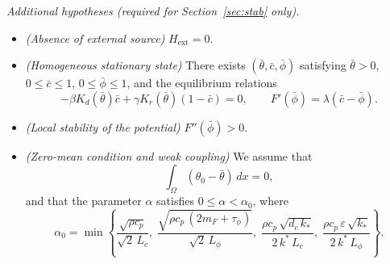 \documentclass[final,1p,times]{elsarticle}
\numberwithin{equation}{section}
\begin{document}
	\smallskip
	\noindent\textit{Additional hypotheses (required for Section~\ref{sec:stab} only).}
	
	\begin{itemize}
		\item[\textbf{(H7)}] \textit{(Absence of external source)}
		$H_{\mathrm{ext}}=0$.
		
		\item[\textbf{(H8)}] \textit{(Homogeneous stationary state)}
		There exists $(\bar\theta,\bar c,\bar\phi)$ satisfying $\bar\theta>0$, $0\le\bar c\le 1$, $0\le\bar\phi\le 1$, and the equilibrium relations
		\[
		-\beta K_d(\bar\theta)\bar c+\gamma K_r(\bar\theta)(1-\bar c)=0,
		\qquad
		F'(\bar\phi)=\lambda(\bar c-\bar\phi).
		\]
		
		\item[\textbf{(H9)}] \textit{(Local stability of the potential)}
		$F''(\bar\phi)>0$.
		
		\item[\textbf{(H10)}] \textit{(Zero-mean condition and weak coupling)} 
		We assume that
		\[
		\int_\Omega (\theta_0 - \bar{\theta})\,dx = 0,
		\]
		and that the parameter $\alpha$ satisfies $0 \leq \alpha < \alpha_0$, where
		\begin{equation}
			\label{eq:alpha0}
			\alpha_0 = \min\left\{
			\frac{\sqrt{\rho c_p}}{\sqrt{2}\,L_c},\;
			\frac{\sqrt{\rho c_p\,(2m_F+\tau_\phi)}}{\sqrt{2}\,L_\phi},\;
			\frac{\rho c_p\,\sqrt{d_c\,k_*}}{2\,k^*\,L_c},\;
			\frac{\rho c_p\,\varepsilon\,\sqrt{k_*}}{2\,k^*\,L_\phi}
			\right\}.
		\end{equation}
		
	\end{itemize}
	
\end{document}
